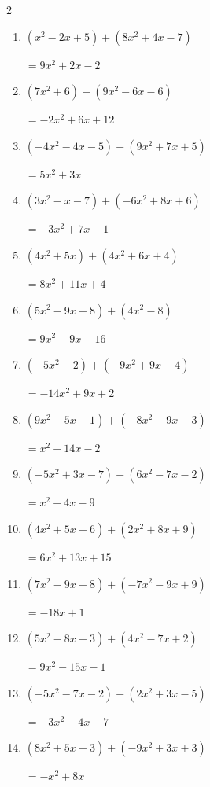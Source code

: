 \begin{multicols}{2}
\begin{enumerate}
  \item $(x^{2}-2x+5)+(8x^{2}+4x-7)$

        $=9x^{2}+2x-2$

  \item $(7x^{2}+6)-(9x^{2}-6x-6)$

        $=-2x^{2}+6x+12$

  \item $(-4x^{2}-4x-5)+(9x^{2}+7x+5)$

        $=5x^{2}+3x$

\columnbreak %

  \item $(3x^{2}-x-7)+(-6x^{2}+8x+6)$

        $=-3x^{2}+7x-1$

  \item $(4x^{2}+5x)+(4x^{2}+6x+4)$

        $=8x^{2}+11x+4$

  \item $(5x^{2}-9x-8)+(4x^{2}-8)$

        $=9x^{2}-9x-16$

  \item $(-5x^{2}-2)+(-9x^{2}+9x+4)$

        $=-14x^{2}+9x+2$

  \item $(9x^{2}-5x+1)+(-8x^{2}-9x-3)$

        $=x^{2}-14x-2$

  \item $(-5x^{2}+3x-7)+(6x^{2}-7x-2)$

        $=x^{2}-4x-9$

  \item $(4x^{2}+5x+6)+(2x^{2}+8x+9)$

        $=6x^{2}+13x+15$

  \item $(7x^{2}-9x-8)+(-7x^{2}-9x+9)$

        $=-18x+1$

  \item $(5x^{2}-8x-3)+(4x^{2}-7x+2)$

        $=9x^{2}-15x-1$

  \item $(-5x^{2}-7x-2)+(2x^{2}+3x-5)$

        $=-3x^{2}-4x-7$

  \item $(8x^{2}+5x-3)+(-9x^{2}+3x+3)$

        $=-x^{2}+8x$


\end{enumerate}
\end{multicols}
